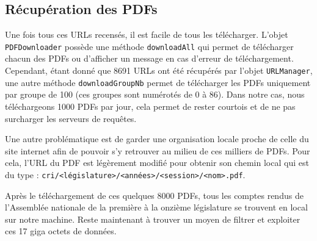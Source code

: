 \subsection{Récupération des PDFs}

Une fois tous ces URLs recensés, il est facile de tous les télécharger. L'objet \verb|PDFDownloader| possède une méthode \verb|downloadAll| qui permet de télécharger chacun des PDFs ou d'afficher un message en cas d'erreur de téléchargement. Cependant, étant donné que 8691 URLs ont été récupérés par l'objet \verb|URLManager|, une autre méthode \verb|downloadGroupNb| permet de télécharger les PDFs uniquement par groupe de 100 (ces groupes sont numérotés de 0 à 86). Dans notre cas, nous téléchargeons 1000 PDFs par jour, cela permet de rester courtois et de ne pas surcharger les serveurs de requêtes.

Une autre problématique est de garder une organisation locale proche de celle du site internet afin de pouvoir s'y retrouver au milieu de ces milliers de PDFs. Pour cela, l'URL du PDF est légèrement modifié pour obtenir son chemin local qui est du type : \verb|cri/<législature>/<années>/<session>/<nom>.pdf|.

Après le téléchargement de ces quelques 8000 PDFs, tous les comptes rendus de l'Assemblée nationale de la première à la onzième législature se trouvent en local sur notre machine. Reste maintenant à trouver un moyen de filtrer et exploiter ces 17 giga octets de données.
